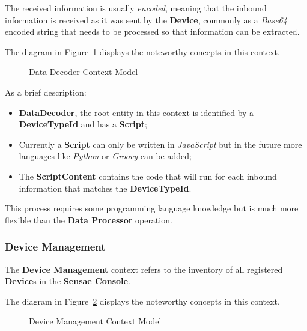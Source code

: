 The received information is usually \textit{encoded}, meaning that the inbound information is received as it was sent by the \textbf{Device}, commonly as a \textit{Base64} encoded string that needs to be processed so that information can be extracted.

The diagram in Figure~\ref{fig:design:domain:bounded_contexts:decoder:diagram} displays the noteworthy concepts in this context.

\begin{figure}[H]
   \centering
  \resizebox{\columnwidth}{!}
  {
     
  }
  \caption[Data Decoder Context Model]{Data Decoder Context Model}
  \label{fig:design:domain:bounded_contexts:decoder:diagram}
\end{figure}

As a brief description:

\begin{itemize}
   \item \textbf{DataDecoder}, the root entity in this context is identified by a \textbf{DeviceTypeId} and has a \textbf{Script};
   \item Currently a \textbf{Script} can only be written in \textit{JavaScript} but in the future more languages like \textit{Python} or \textit{Groovy} can be added;
   \item The \textbf{ScriptContent} contains the code that will run for each inbound information that matches the \textbf{DeviceTypeId}.
\end{itemize}

This process requires some programming language knowledge but is much more flexible than the \textbf{Data Processor} operation.

\subsubsection*{Device Management}
\label{subsubsec:design:domain:bounded_contexts:device}

The \textbf{Device Management} context refers to the inventory of all registered \textbf{Device}s in the \textbf{Sensae Console}.

The diagram in Figure~\ref{fig:design:domain:bounded_contexts:device:diagram} displays the noteworthy concepts in this context.

\begin{figure}[H]
   \centering
  \resizebox{\columnwidth}{!}
  {
     
  }
  \caption[Device Management Context Model]{Device Management Context Model}
  \label{fig:design:domain:bounded_contexts:device:diagram}
\end{figure}

